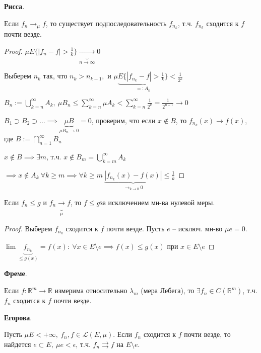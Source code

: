 \begin{theorem}
    \textbf{Рисса}.

    Если $f_n \rightarrow_{\mu} f$, то существует подпоследовательность $f_{n_k}$, т.ч. $f_{n_k}$ сходится к $f$ почти везде.
\end{theorem}
\begin{proof}
    $\mu E \{ |f_n - f| > \frac{1}{k} \} \underbrace{\rightarrow}_{n \rightarrow \infty} 0$

    Выберем $n_k$ так, что $n_k > n_{k - 1},$ и $\mu \underbrace{E \{ |f_{n_k} - f| > \frac{1}{k} \}}_{=: A_k} < \frac{1}{2^k}$

    $B_n := \bigcup_{k=n}^{\infty} A_k, \ \mu B_n \leq \sum_{k=n}^{\infty} \mu A_k < \sum_{k=n}^{\infty} \frac{1}{2^k} = \frac{1}{2^{n - 1}} \rightarrow 0$

    $B_1 \supset B_2 \supset \dots \implies \underbrace{\mu B}_{\mu B_n \rightarrow 0} = 0$, проверим, что если $x \notin B$, то $f_{n_k}(x) \rightarrow f(x)$, где $B := \bigcap_{n=1}^{\infty} B_n$

    $x \notin B \implies \exists m$, т.ч. $x \notin B_m = \bigcup_{k=m}^{\infty} A_k$

    $\implies x \notin A_k \ \forall k \geq m \implies \forall k \geq m \ \underbrace{|f_{n_k}(x) - f(x)|}_{\rightarrow_{k \rightarrow 0} 0} \leq \frac{1}{k}$
\end{proof}

\begin{consequence}
    Если $f_n \leq g$ и $f_n \underbrace{\rightarrow}_{\mu} f$, то $f \leq g$за исключением мн-ва нулевой меры.
\end{consequence}
\begin{proof}
    Выберем $f_{n_k}$ сходится к $f$ почти везде. Пусть $e$ -- исключ. мн-во $\mu e = 0$.

    $\lim \underbrace{f_{n_k}}_{\leq g(x)} = f(x): \ \forall x \in E \setminus e \implies f(x) \leq g(x)$ при $x \in E \setminus e$
\end{proof}

\begin{theorem}
    \textbf{Фреме}.

    Если $f: \mathbb{R}^{m} \rightarrow \mathbb{R}$ измерима относительно $\lambda_m$ (мера Лебега), то $\exists f_n \in C(\mathbb{R}^m)$, т.ч. $f_n$ сходится к $f$ почти везде.
\end{theorem}


\begin{theorem}
    \textbf{Егорова}.

    Пусть $\mu E < + \infty, \ f_n, f \in \mathscr{L}(E, \mu)$. Если $f_n$ сходится к $f$ почти везде, то найдется $e \subset E, \ \mu e < \epsilon$, т.ч. $f_n \rightrightarrows f$ на $E \setminus e$.
\end{theorem}

